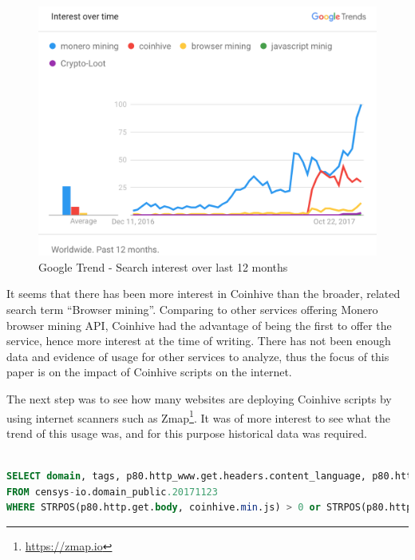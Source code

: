 \begin{figure}[t]
\centering
\includegraphics[width=\linewidth]{figures/usage_over_time2.png}
\caption{Google Trend - Search interest over last 12 months}
\end{figure}

It seems that there has been more interest in Coinhive than the broader, related search term ``Browser mining''. Comparing to other services offering Monero browser mining API, Coinhive had the advantage of being the first to offer the service, hence more interest at the time of writing. There has not been enough data and evidence of usage for other services to analyze, thus the focus of this paper is on the impact of Coinhive scripts on the internet. 

The next step was to see how many websites are deploying Coinhive scripts by using internet scanners such as Zmap\footnote{\url{https://zmap.io}}. It was of more interest to see what the trend of this usage was, and for this purpose historical data was required. 

\begin{lstlisting}[caption={BigQuery SQL query to find websites using the Coinhive mining script using censys.io datasets},label={lst:bigquery},language=sql,linewidth=\linewidth]

SELECT domain, tags, p80.http_www.get.headers.content_language, p80.http_www.get.headers.server, p80.http.get.headers.x_powered_by, p80.http.get.title, p80.http_www.get.body as wwwbody, p80.http.get.body as plainbody 
FROM censys-io.domain_public.20171123
WHERE STRPOS(p80.http.get.body, coinhive.min.js) > 0 or STRPOS(p80.http_www.get.body, coinhive.min.js) >0)

\end{lstlisting}

